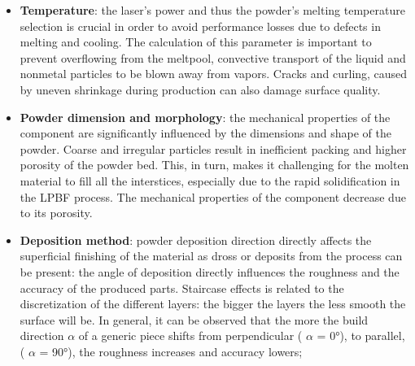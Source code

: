 \begin{itemize}
    \item \textbf{Temperature}: the laser's power and thus the powder's melting temperature selection is crucial in order to avoid performance losses due to defects in melting and cooling. The calculation of this parameter is important to prevent overflowing from the meltpool, convective transport of the liquid and nonmetal particles to be blown away from vapors. Cracks and curling, caused by uneven shrinkage during production can also damage surface quality\cite{lpbf_accuracy}. 
    \item  \textbf{Powder dimension and morphology}: the mechanical properties of the component are significantly influenced by the dimensions and shape of the powder. Coarse and irregular particles result in inefficient packing and higher porosity of the powder bed. This, in turn, makes it challenging for the molten material to fill all the interstices, especially due to the rapid solidification in the LPBF process. The mechanical properties of the component decrease due to its porosity\cite{dimension_powder}.
    \item  \textbf{Deposition method}: powder deposition direction directly affects the superficial finishing of the material as dross or deposits from the process can be present: the angle of deposition directly influences the roughness and the accuracy of the produced parts. Staircase effects is related to the discretization of the different layers: the bigger the layers the less smooth the surface will be. In general, it can be observed that the more the build direction $\alpha$ of a generic piece shifts from perpendicular ( $\alpha$ = 0°), to parallel, ( $\alpha$ = 90°), the roughness increases and accuracy lowers\cite{tesi_dottorato};
\end{itemize}




